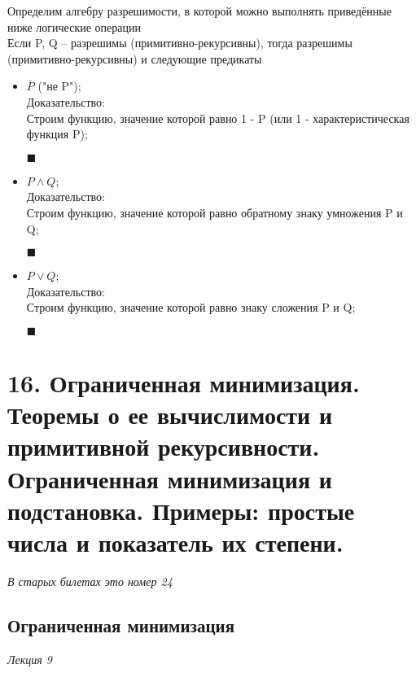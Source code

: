 \documentclass{article}
\begin{document}
    Определим алгебру разрешимости, в которой можно выполнять приведённые ниже логические операции\\
    Если P, Q -- разрешимы (примитивно-рекурсивны), тогда разрешимы (примитивно-рекурсивны) и следующие предикаты
    \begin{itemize}
        \item $\bar P$ ("не P");\\
        Доказательство:
        \\ Строим функцию, значение которой равно 1 - P (или 1 - характеристическая функция P);
        \begin{flushright}
            $\blacksquare$
        \end{flushright}
        \item $P \wedge Q$;\\
        Доказательство:
        \\ Строим функцию, значение которой равно обратному знаку умножения P и Q;
        \begin{flushright}
            $\blacksquare$
        \end{flushright}

        \item $P \vee Q$;\\
        Доказательство:
        \\ Строим функцию, значение которой равно знаку сложения P и Q;
        \begin{flushright}
            $\blacksquare$
        \end{flushright}
    \end{itemize}
    

\section{16. Ограниченная минимизация. Теоремы о ее вычислимости и примитивной рекурсивности.
Ограниченная минимизация и подстановка. Примеры: простые числа и показатель их
степени.}    

\emph{В старых билетах это номер 24}\\

    \subsection{Ограниченная минимизация}
    \emph{Лекция 9}
        
\end{document}
